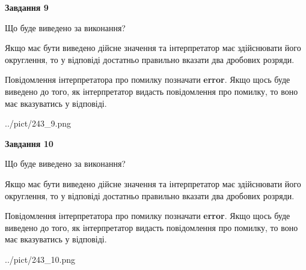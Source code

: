 \documentclass[12pt, ukrainian]{article}
\begin{document}
{\begin {Large}
{\begin {center}\textbf{Завдання 9}\end {center}}\par
Що буде виведено за виконання? \par

Якщо має бути виведено дійсне значення та інтерпретатор має здійснювати його округлення, 
то у відповіді достатньо правильно вказати два дробових розряди.

Повідомлення інтерпретатора про помилку позначати \textbf{error}.
Якщо щось буде виведено до того, як інтерпретатор видасть повідомлення про помилку, 
то воно має вказуватись у відповіді. \par

\begin{center}
	{../pict/243_9.png}
\end{center}
\newpage

{\begin {center}\textbf{Завдання 10}\end {center}}\par
Що буде виведено за виконання? \par

Якщо має бути виведено дійсне значення та інтерпретатор має здійснювати його округлення, 
то у відповіді достатньо правильно вказати два дробових розряди.

Повідомлення інтерпретатора про помилку позначати \textbf{error}.
Якщо щось буде виведено до того, як інтерпретатор видасть повідомлення про помилку, 
то воно має вказуватись у відповіді. \par

\begin{center}
	{../pict/243_10.png}
\end{center}
\newpage

\end {Large}}
\end{document}
